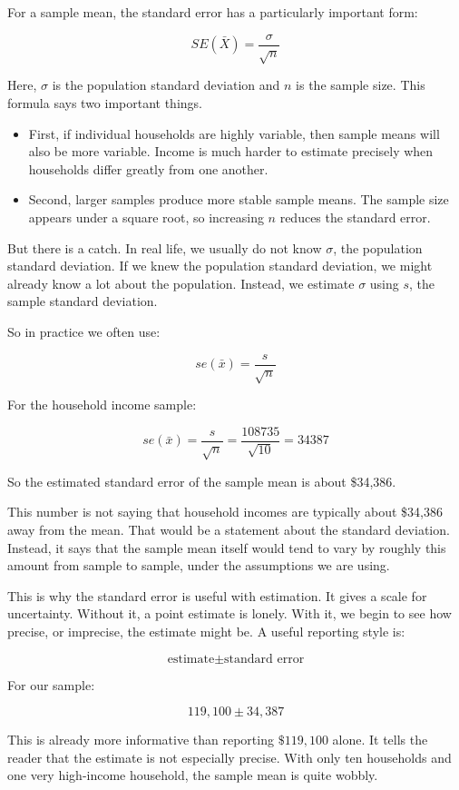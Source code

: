 \documentclass[
  letterpaper,
  DIV=11,
  numbers=noendperiod]{scrreprt}
\providecommand{\tightlist}{%
  \setlength{\itemsep}{0pt}\setlength{\parskip}{0pt}}
\begin{document}
For a sample mean, the standard error has a particularly important form:

\[
SE(\bar{X}) = \frac{\sigma}{\sqrt{n}}
\]

Here, \(\sigma\) is the population standard deviation and \(n\) is the
sample size. This formula says two important things.

\begin{itemize}
\tightlist
\item
  First, if individual households are highly variable, then sample means
  will also be more variable. Income is much harder to estimate
  precisely when households differ greatly from one another.
\item
  Second, larger samples produce more stable sample means. The sample
  size appears under a square root, so increasing \(n\) reduces the
  standard error.
\end{itemize}

But there is a catch. In real life, we usually do not know \(\sigma\),
the population standard deviation. If we knew the population standard
deviation, we might already know a lot about the population. Instead, we
estimate \(\sigma\) using \(s\), the sample standard deviation.

So in practice we often use:

\[
se(\bar{x}) = \frac{s}{\sqrt{n}}
\]

For the household income sample:

\[
se(\bar{x})
=
\frac{s}{\sqrt{n}}
=
\frac{108735}{\sqrt{10}}
=
34387
\]

So the estimated standard error of the sample mean is about \$34,386.

This number is not saying that household incomes are typically about
\$34,386 away from the mean. That would be a statement about the
standard deviation. Instead, it says that the sample mean itself would
tend to vary by roughly this amount from sample to sample, under the
assumptions we are using.

This is why the standard error is useful with estimation. It gives a
scale for uncertainty. Without it, a point estimate is lonely. With it,
we begin to see how precise, or imprecise, the estimate might be. A
useful reporting style is:

\[
\text{estimate} \pm \text{standard error}
\]

For our sample:

\[
119{,}100 \pm 34{,}387
\]

This is already more informative than reporting \(\$119{,}100\) alone.
It tells the reader that the estimate is not especially precise. With
only ten households and one very high-income household, the sample mean
is quite wobbly.
\end{document}
